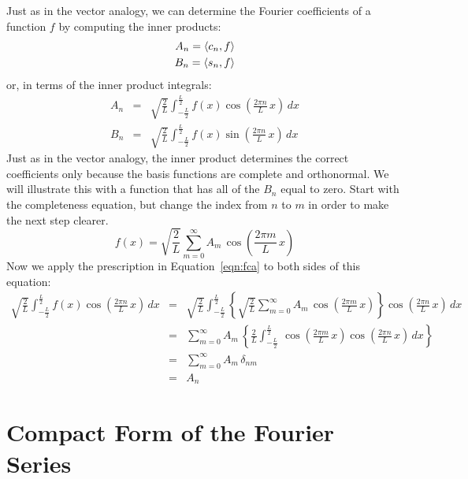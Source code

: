 \documentclass[12pt]{article}
\begin{document}
Just as in the vector analogy, we can determine the Fourier coefficients of a function $f$ by computing the inner products:
\begin{eqnarray*}
A_n = \braket{c_n, f} \\
B_n = \braket{s_n, f} 
\end{eqnarray*}
or, in terms of the inner product integrals:
\begin{eqnarray}
A_n &=& \sqrt{\frac{2}{L}} \int_{-\frac{L}{2}}^{\frac{L}{2}} 
f(x) \cos\left(\frac{2\pi n}{L} \, x \right) \, dx \label{eqn:fca} \\
B_n &=& \sqrt{\frac{2}{L}} \int_{-\frac{L}{2}}^{\frac{L}{2}} \nonumber
f(x) \sin\left(\frac{2\pi n}{L} \, x \right) \, dx
\end{eqnarray}
Just as in the vector analogy, the inner product determines the correct coefficients only because the basis functions are complete and orthonormal.  We will illustrate this with a function that has all of the $B_n$ equal to zero.  Start with the completeness equation, but change the index from $n$ to $m$ in order to make the next step clearer.  
\begin{displaymath}
f(x) = \sqrt{\frac{2}{L}} \sum_{m=0}^{\infty}  A_m \, \cos\left(\frac{2\pi m}{L} \, x \right)
\end{displaymath}
Now we apply the prescription in Equation~\ref{eqn:fca} to both sides of this equation:
\begin{eqnarray*}
\sqrt{\frac{2}{L}} \int_{-\frac{L}{2}}^{\frac{L}{2}} 
f(x)  \cos\left(\frac{2\pi n}{L} \, x \right) \, dx  
&=& \sqrt{\frac{2}{L}} \int_{-\frac{L}{2}}^{\frac{L}{2}} 
\left\{
\sqrt{\frac{2}{L}} \sum_{m=0}^{\infty}  A_m \, \cos\left(\frac{2\pi m}{L} \, x \right) \right\}
\cos\left(\frac{2\pi n}{L} \, x \right) \, dx \\
&=& \sum_{m=0}^{\infty}  A_m \, \left\{ \frac{2}{L} 
\int_{-\frac{L}{2}}^{\frac{L}{2}} 
 \, \cos\left(\frac{2\pi m}{L} \, x \right) \cos\left(\frac{2\pi n}{L} \, x \right) \, dx \right\}\\
&=& \sum_{m=0}^{\infty}  A_m \, \delta_{nm} \\
&=& A_n
\end{eqnarray*}

\section{Compact Form of the Fourier Series}
\end{document}

